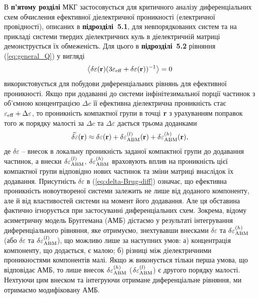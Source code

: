 \documentclass[twoside,a4paper,14pt]{vakaref}
\begin{document}
В {\bf п'ятому розділі} МКГ застосовується для критичного аналізу диференціальних схем обчислення ефективної діелектричної проникності (електричної провідності), описаних в {\bf підрозділі~5.1}, для невпорядкованих систем та на прикладі системи твердих діелектричних куль в діелектричній матриці демонструється їх  обмеженість. Для цього в {\bf підрозділі~5.2} рівняння (\ref{eq:general_Q}) у вигляді $$\left\langle \delta\varepsilon({\bf r})(3\varepsilon_{\rm eff} + \delta\varepsilon({\bf r}))^{-1} \right\rangle = 0$$
використовується для побудови диференціальних рівнянь для ефективної проникності. Якщо при додаванні до системи інфінітезимальної порції частинок з об'ємною концентрацією $\Delta c$ її ефективна діелектрична проникність стає $\varepsilon_{\rm eff} + \Delta\varepsilon$, то проникність компактної групи в точці $\bf r$ з урахуванням поправок того ж порядку малості за $\Delta c$ та $\Delta\varepsilon$ дається трьома доданками
\begin{equation}\label{eq:delta-Brug-diff}
\begin{split}
\widetilde{\delta\varepsilon} ({\bf r}) \approx \delta\varepsilon ({\bf r})+ \delta\varepsilon_{\rm ABM}^{(l)} ({\bf r}) + \delta\varepsilon_{\rm ABM}^{(h)} ({\bf r}) ,
\end{split}
\end{equation}
де $\delta\varepsilon$ -- внесок в локальну проникність заданої компактної групи до додавання частинок, а внески $\delta\varepsilon_{\rm ABM}^{(l)}$, $\delta\varepsilon_{\rm ABM}^{(h)}$ враховують  вплив на проникність цієї компактної групи відповідно нових частинок та зміни матриці внаслідок їх додавання. 
Присутність $\delta\varepsilon$ в (\ref{eq:delta-Brug-diff}) означає, що ефективна проникність новоутвореної системи залежить не лише від доданого компоненту, але й від властивостей системи на момент його додавання. Але ця обставина фактично ігнорується при застосуванні диференціальних схем. Зокрема, відому асиметричну модель Бруггемана (АМБ) дістаємо у результаті інтегрування диференціального рівняння, яке отримуємо, знехтувавши внесками $\delta\varepsilon $ та $\delta\varepsilon_{\rm ABM}^{(h)}$ 
(або $\delta\varepsilon $ та $\delta\varepsilon_{\rm ABM}^{(l)}$), що можливо лише за наступних умов: 
а) концентрація компоненту, що додається, є малою;
б) різниці між діелектричними проникностями компонентів малі.
Якщо ж виконується тільки перша умова, що відповідає АМБ, то лише внесок $\delta\varepsilon_{\rm ABM}^{(h)}$ ($\delta\varepsilon_{\rm ABM}^{(l)}$) є другого порядку малості. Нехтуючи цим внеском та інтегруючи отримане диференціальне рівняння, ми отримаємо модифіковану АМБ. 
\end{document}
